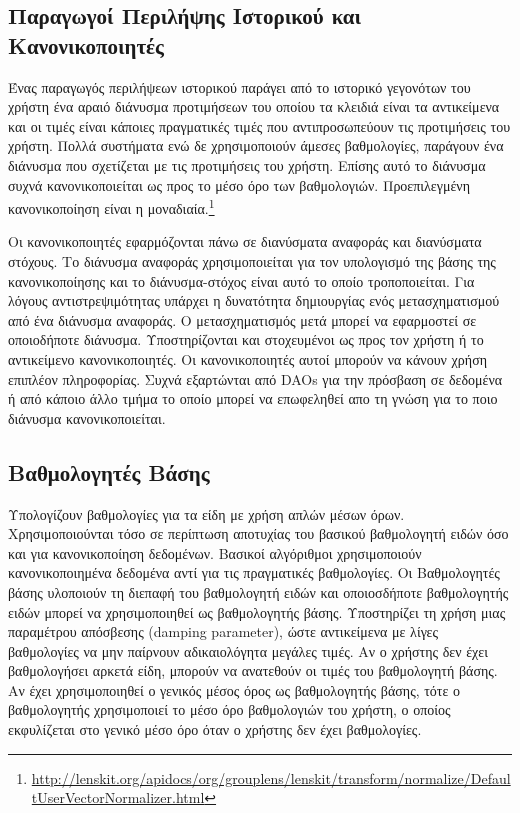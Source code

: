 \subsection{Παραγωγοί Περιλήψης Ιστορικού και Κανονικοποιητές}
Ένας παραγωγός περιλήψεων ιστορικού παράγει από το ιστορικό γεγονότων του χρήστη ένα αραιό διάνυσμα προτιμήσεων του οποίου τα κλειδιά είναι τα αντικείμενα και οι τιμές είναι κάποιες πραγματικές τιμές που αντιπροσωπεύουν τις προτιμήσεις του χρήστη. Πολλά συστήματα ενώ δε χρησιμοποιούν άμεσες βαθμολογίες, παράγουν ένα διάνυσμα που σχετίζεται με τις προτιμήσεις του χρήστη. Επίσης αυτό το διάνυσμα συχνά κανονικοποιείται ως προς το μέσο όρο των βαθμολογιών. Προεπιλεγμένη κανονικοποίηση είναι η μοναδιαία.\footnote{\en \url{http://lenskit.org/apidocs/org/grouplens/lenskit/transform/normalize/DefaultUserVectorNormalizer.html}} \par
Οι κανονικοποιητές εφαρμόζονται πάνω σε διανύσματα αναφοράς και διανύσματα στόχους. Το διάνυσμα αναφοράς χρησιμοποιείται για τον υπολογισμό της βάσης της κανονικοποίησης και το διάνυσμα-στόχος είναι αυτό το οποίο τροποποιείται. Για λόγους αντιστρεψιμότητας υπάρχει η δυνατότητα δημιουργίας ενός μετασχηματισμού από ένα διάνυσμα αναφοράς. Ο μετασχηματισμός μετά μπορεί να εφαρμοστεί σε οποιοδήποτε διάνυσμα. Υποστηρίζονται και στοχευμένοι ως προς τον χρήστη ή το αντικείμενο κανονικοποιητές. Οι κανονικοποιητές αυτοί μπορούν να κάνουν χρήση επιπλέον πληροφορίας. Συχνά εξαρτώνται από \en DAOs \el για την πρόσβαση σε δεδομένα ή από κάποιο άλλο τμήμα το οποίο μπορεί να επωφεληθεί απο τη γνώση για το ποιο διάνυσμα κανονικοποιείται.
\subsection{Βαθμολογητές Βάσης}
Υπολογίζουν βαθμολογίες για τα είδη με χρήση απλών μέσων όρων. Χρησιμοποιούνται τόσο σε περίπτωση αποτυχίας του βασικού βαθμολογητή ειδών όσο και για κανονικοποίηση δεδομένων. Βασικοί αλγόριθμοι χρησιμοποιούν κανονικοποιημένα δεδομένα αντί για τις πραγματικές βαθμολογίες. Οι Βαθμολογητές βάσης υλοποιούν τη διεπαφή του βαθμολογητή ειδών και οποιοσδήποτε βαθμολογητής ειδών μπορεί να χρησιμοποιηθεί ως βαθμολογητής βάσης. Υποστηρίζει τη χρήση μιας παραμέτρου απόσβεσης (\en damping parameter)\el, ώστε αντικείμενα με λίγες βαθμολογίες να μην παίρνουν αδικαιολόγητα μεγάλες τιμές. Αν ο χρήστης δεν έχει βαθμολογήσει αρκετά είδη, μπορούν να ανατεθούν οι τιμές του βαθμολογητή βάσης. Αν έχει χρησιμοποιηθεί ο γενικός μέσος όρος ως βαθμολογητής βάσης, τότε ο βαθμολογητής χρησιμοποιεί το μέσο όρο βαθμολογιών του χρήστη, ο οποίος εκφυλίζεται στο γενικό μέσο όρο όταν ο χρήστης δεν έχει βαθμολογίες.
